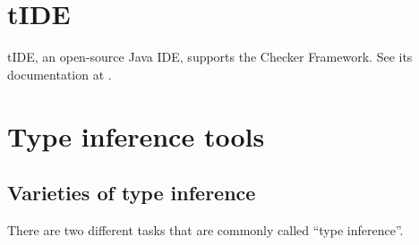 \section{tIDE\label{tide}}

\begin{sloppypar}
tIDE, an open-source Java IDE, supports the Checker Framework.  See its
documentation at .
\end{sloppypar}


\section{Type inference tools\label{type-inference-tools}}

\subsection{Varieties of type inference\label{type-inference-varieties}}

There are two different tasks that are commonly called ``type inference''.


